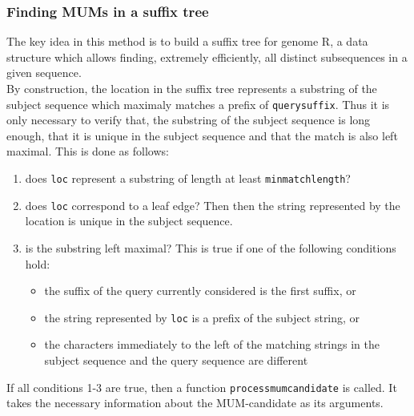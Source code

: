 \documentclass[3p,times]{elsarticle}
\begin{document}
\subsubsection{Finding MUMs in a suffix tree} 
The key idea in this method is to build a suffix tree for genome R, a data structure which allows finding, extremely efficiently, all distinct subsequences in a given sequence.\\
  By construction, the location in the suffix tree represents a 
  substring of the subject sequence which maximaly matches a prefix of
  \texttt{querysuffix}. Thus it is only necessary to verify that,
  the substring of the subject sequence is long enough, that it
  is unique in the subject sequence and that the match
  is also left maximal. This is done as follows:
  
  \begin{enumerate}
  \item
  does \texttt{loc} represent a substring of length at least 
  \texttt{minmatchlength}?
  \item
  does \texttt{loc} correspond to a leaf edge? Then then the string 
  represented by the location is unique in the subject sequence.
  \item
  is the substring left maximal? This is true if one of the following
  conditions hold:
  \begin{itemize}
  \item
  the suffix of the query currently considered is the first suffix, or 
  \item
  the string represented by \texttt{loc} is a prefix of the subject string,
  or
  \item
  the characters immediately to the left of the matching strings
  in the subject sequence and the query sequence are different
  \end{itemize}
  \end{enumerate}
  If all conditions 1-3 are true, then a function 
  \texttt{processmumcandidate} is called. It takes the necessary 
  information about the MUM-candidate as its arguments. 
\end{document}
